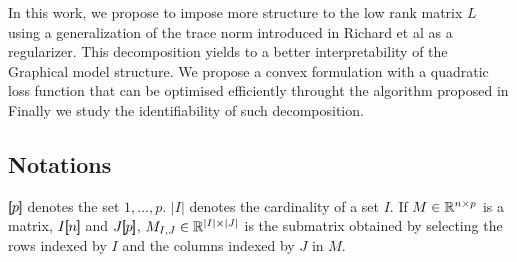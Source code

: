 In this work, we propose to impose more structure to the low rank matrix $L$ using a generalization of the trace norm introduced in Richard et al as a regularizer. This decomposition yields to a better interpretability of the Graphical model structure. We propose a convex formulation with a quadratic loss function that can be optimised efficiently throught the algorithm proposed in \citet{vinyes2017}  Finally we study the identifiability of such decomposition. 

\subsection*{Notations}
$[\!\![p]\!\!]$ denotes the set ${1,...,p}$. $|I|$ denotes the cardinality of a set $I$. If $M\in\mathbb{R}^{n\times p}$ is a matrix, $I[\!\![n]\!\!]$ and $J[\!\![p]\!\!]$, $M_{I,J}\in\mathbb{R}^{|I|\times |J|}$ is the submatrix obtained by selecting the rows indexed by $I$ and the columns indexed by $J$ in $M$.

%
